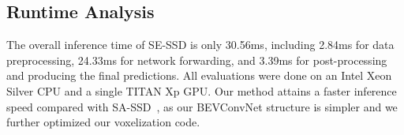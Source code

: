 \documentclass[letterpaper]{article}
\begin{document}
\subsection{Runtime Analysis}
The overall inference time of SE-SSD is only 30.56ms, including
2.84ms for data preprocessing,
24.33ms for network forwarding, and
3.39ms for post-processing and producing the final predictions.
All evaluations were done on an Intel Xeon Silver CPU and a single TITAN Xp GPU.
Our method attains a faster inference speed compared with SA-SSD~\cite{he2020structure}, as our BEVConvNet structure is simpler and we further optimized our voxelization code.



\ifx\allfiles\undefined
\end{document}
